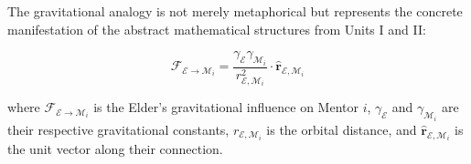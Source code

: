 The gravitational analogy is not merely metaphorical but represents the concrete manifestation of the abstract mathematical structures from Units I and II:

\begin{equation}
\mathcal{F}_{\mathcal{E} \rightarrow \mathcal{M}_i} = \frac{\gamma_{\mathcal{E}} \gamma_{\mathcal{M}_i}}{r_{\mathcal{E},\mathcal{M}_i}^2} \cdot \mathbf{\hat{r}}_{\mathcal{E},\mathcal{M}_i}
\end{equation}

where $\mathcal{F}_{\mathcal{E} \rightarrow \mathcal{M}_i}$ is the Elder's gravitational influence on Mentor $i$, $\gamma_{\mathcal{E}}$ and $\gamma_{\mathcal{M}_i}$ are their respective gravitational constants, $r_{\mathcal{E},\mathcal{M}_i}$ is the orbital distance, and $\mathbf{\hat{r}}_{\mathcal{E},\mathcal{M}_i}$ is the unit vector along their connection.

